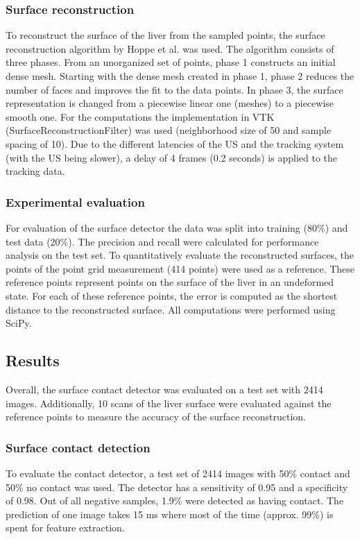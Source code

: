 \subsubsection{Surface reconstruction}
To reconstruct the surface of the liver from the sampled points, the surface
reconstruction algorithm by Hoppe et al. \cite{hoppe1992surface}  was used. The algorithm consists
of three phases. From an unorganized set of points, phase 1 constructs an
initial dense mesh. Starting with the dense mesh created in phase 1, phase 2
reduces the number of faces and improves the fit to the data points. In phase 3,
the surface representation is changed from a piecewise linear one (meshes) to a
piecewise smooth one. For the computations the implementation in VTK
(SurfaceReconstructionFilter) was used (neighborhood size of 50 and sample
spacing of 10). Due to the different latencies of the US and the tracking system
(with the US being slower), a delay of 4 frames (0.2 seconds) is applied to the
tracking data.

\subsubsection{Experimental evaluation}
For evaluation of the surface detector the data was split into training (80\%)
and test data (20\%). The precision and recall were calculated for performance
analysis on the test set. To quantitatively evaluate the reconstructed surfaces,
the points of the point grid measurement (414 points) were used as a reference.
These reference points represent points on the surface of the liver in an
undeformed state. For each of these reference points, the error is computed as
the shortest distance to the reconstructed surface. All computations were
performed using SciPy.

\subsection{Results}
Overall, the surface contact detector was evaluated on a test set with 2414
images. Additionally, 10 scans of the liver surface were evaluated against the
reference points to measure the accuracy of the surface reconstruction.

\subsubsection{Surface contact detection}
To evaluate the contact detector, a test set of 2414 images with 50\% contact
and 50\% no contact was used. The detector has a sensitivity of 0.95 and a
specificity of 0.98. Out of all negative samples, 1.9\% were detected as having
contact. The prediction of one image takes 15 ms where most of the time (approx.
99\%) is spent for feature extraction.

